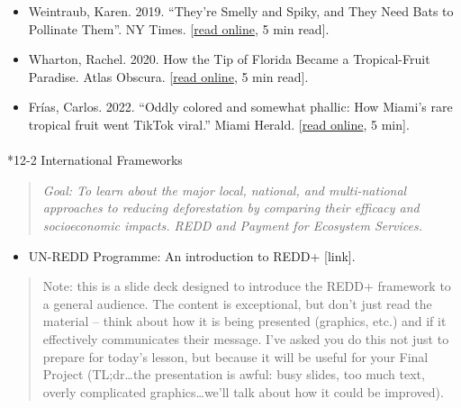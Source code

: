 \documentclass[
  10pt,
  letterpaper,
  oneside,
  open=any]{scrbook}
\makeatletter
\let\oldparagraph\paragraph
\renewcommand{\paragraph}{
    \@ifstar
      \xxxParagraphStar
      \xxxParagraphNoStar
  }
\newcommand{\xxxParagraphStar}[1]{\oldparagraph*{#1}\mbox{}}
\newcommand{\xxxParagraphNoStar}[1]{\oldparagraph{#1}\mbox{}}
\providecommand{\tightlist}{%
  \setlength{\itemsep}{0pt}\setlength{\parskip}{0pt}}
\makeatother
\begin{document}
\begin{itemize}
\item
  Weintraub, Karen. 2019. ``They're Smelly and Spiky, and They Need Bats
  to Pollinate Them''. NY Times.
  {[}\href{https://www.nytimes.com/2019/12/04/science/bats-durians-indonesia.html}{read
  online}, 5 min read{]}.
\item
  Wharton, Rachel. 2020. How the Tip of Florida Became a Tropical-Fruit
  Paradise. Atlas Obscura.
  {[}\href{https://www.atlasobscura.com/articles/tropical-fruit-farms-in-united-states}{read
  online}, 5 min read{]}.
\item
  Frías, Carlos. 2022. ``Oddly colored and somewhat phallic: How Miami's
  rare tropical fruit went TikTok viral.'' Miami Herald.
  {[}\href{https://www.miamiherald.com/miami-com/restaurants/article263608093.html\#storylink=cpyhttps://www.miamiherald.com/miami-com/restaurants/article263608093.html}{read
  online}, 5 min{]}.
\end{itemize}

\paragraph*{12-2 International
Frameworks}\label{international-frameworks}

\begin{quote}
\emph{Goal: To learn about the major local, national, and multi-national
approaches to reducing deforestation by comparing their efficacy and
socioeconomic impacts. REDD and Payment for Ecosystem Services.}
\end{quote}

\begin{itemize}
\tightlist
\item
  UN-REDD Programme: An introduction to REDD+ {[}link{]}.
\end{itemize}

\begin{quote}
Note: this is a slide deck designed to introduce the REDD+ framework to
a general audience. The content is exceptional, but don't just read the
material -- think about how it is being presented (graphics, etc.) and
if it effectively communicates their message. I've asked you do this not
just to prepare for today's lesson, but because it will be useful for
your Final Project (TL;dr\ldots the presentation is awful: busy slides,
too much text, overly complicated graphics\ldots we'll talk about how it
could be improved).
\end{quote}
\end{document}
